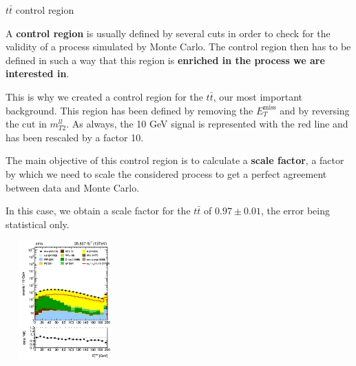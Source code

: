 \documentclass[handout,8 pt]{beamer}
\begin{document}
\begin{frame}{$t \bar t$ control region}

	\justifying
	A \textbf{control region} is usually defined by several cuts in order to check for the validity of a process simulated by Monte Carlo. The control region then has to be defined in such a way that this region is \textbf{enriched in the process we are interested in}. \vfill
	
	This is why we created a control region for the $t \bar t$, our most important background. This region has been defined by removing the $E_T^{\text{miss}}$ and by reversing the cut in $m_{T2}^{ll}$. As always, the 10 GeV signal is represented with the red line and has been rescaled by a factor 10. \vfill

	\hspace{30pt}
   \begin{minipage}[c]{.42\linewidth}
   	\justifying
   	 The main objective of this control region is to calculate a \textbf{scale factor}, a factor by which we need to scale the considered process to get a perfect agreement between data and Monte Carlo.
	 \begin{block}{}
	 \justifying
	 In this case, we obtain a scale factor for the $t \bar t$ of $0.97 \pm 0.01$, the error being statistical only.
	 \end{block}
   \end{minipage} \hfill
    \begin{minipage}[c]{.48\linewidth}
	\begin{center}
	\includegraphics[width= 130pt, height= 130pt]{figs/metPfType1_log-ttCR2.png}
	\end{center}
   \end{minipage} \hfill \vfill

\end{frame}
\end{document}
